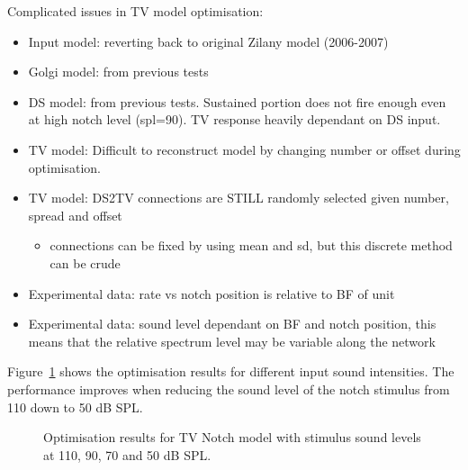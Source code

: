 Complicated issues in TV model optimisation:
\begin{itemize}
\item Input model: reverting back to original Zilany model (2006-2007)
\item Golgi model: from previous tests 
\item DS model: from previous tests.  Sustained portion does not fire enough
  even at high notch level (spl=90).  TV response heavily dependant on DS input.
\item TV model: Difficult to reconstruct model by changing number or offset
  during optimisation.
\item TV model: DS2TV connections are STILL randomly selected given number,
  spread and offset
  \begin{itemize}
  \item connections can be fixed by using mean and sd, but this discrete method can be crude
  \end{itemize}
\item Experimental data: rate vs notch position is relative to BF of unit
\item Experimental data: sound level dependant on BF and notch position, this
  means that the relative spectrum level may be variable along the network
\end{itemize}


\smallskip{}

Figure~\ref{fig:TV_result_spl} shows the optimisation results for different
input sound intensities.  The performance improves when reducing the sound level
of the notch stimulus from 110 down to 50 dB SPL.
\begin{figure}[!ht]
  \centering
  \caption{Optimisation results for TV Notch model with stimulus sound levels at
    110, 90, 70 and 50 dB SPL.}
  \label{fig:TV_result_spl}
\end{figure}

